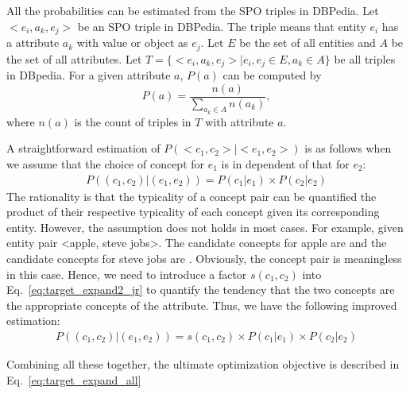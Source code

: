All the probabilities can be estimated from the SPO triples in DBPedia.   Let $<e_i, a_k, e_j>$ be an SPO triple in DBPedia.
The triple means that entity $e_i$ has a attribute $a_k$ with value or object as $e_j$.  Let $E$ be the set of all entities and $A$
be the set of all attributes. Let $T=\{<e_i, a_k, e_j>|e_i,e_j\in E, a_k\in A\}$ be all triples in DBpedia. For a given attribute $a$, $P(a)$ can be computed by
\begin{equation}
\label{eq:pa}
P(a)=\frac{n(a)}{\sum_{a_k\in A}{n(a_k)}},
\end{equation}
where $n(a)$ is the count of triples in $T$ with attribute $a$.

A straightforward estimation of $P(<c_{1},c_{2}>|<e_{1},e_{2}>)$ is as follows when we assume that the choice of concept for $e_1$ is in dependent of that for $e_2$:
\begin{equation}
\label{eq:target_expand2_naive}
\begin{split}
P((c_{1},c_{2})|(e_{1},e_{2})) = P(c_1|e_1) \times P(c_2|e_2)
\end{split}
\end{equation} The rationality is that the typicality of a concept pair can be quantified the product of their respective typicality of each concept given its corresponding entity.
However, the assumption does not holds in most cases. For example, given entity pair \ac{<apple, steve jobs>}. The candidate concepts for \ac{apple} are  and the candidate concepts for \ac{steve jobs} are . Obviously, the concept pair  is meaningless in this case. Hence, we need to introduce a factor $s(c_1,c_2)$ into Eq.~\ref{eq:target_expand2_jr} to quantify the tendency that the two concepts are the appropriate concepts of the attribute. Thus, we have the following improved estimation:
\begin{equation}
\label{eq:target_expand2_jr}
\begin{split}
P((c_{1},c_{2})|(e_{1},e_{2})) = s(c_1,c_2) \times P(c_1|e_1) \times P(c_2|e_2)
\end{split}
\end{equation}


Combining all these together, the ultimate optimization objective is described in Eq.~\ref{eq:target_expand_all}

